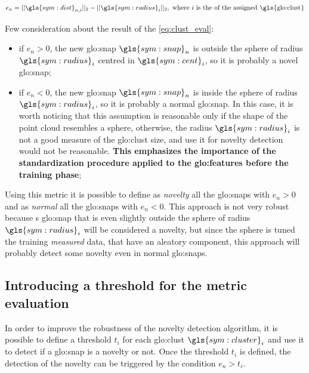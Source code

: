 \begin{equation}
  \label{eq:clust_eval}
  e_{n} = ||\gls{sym:dist}_{n,i}||_2 - ||\gls{sym:radius}_{i}||_2, \text{ where $i$ is the of the assigned \gls{glo:clust}}
\end{equation}

Few consideration about the result of the \autoref{eq:clust_eval}:
\begin{itemize}
  \item if $e_{n} > 0$, the new {\gls{glo:snap}} $\gls{sym:snap}_n$ is outside the sphere of radius $\gls{sym:radius}_i$ centred in $\gls{sym:cent}_i$, so it is probably a novel {\gls{glo:snap}};
  \item if $e_{n} < 0$, the new {\gls{glo:snap}} $\gls{sym:snap}_n$ is inside the sphere of radius $\gls{sym:radius}_i$, so it is probably a normal {\gls{glo:snap}}. In this case, it is worth noticing that this assumption is reasonable only if the shape of the point cloud resembles a sphere, otherwise, the radius $\gls{sym:radius}_i$ is not a good measure of the \gls{glo:clust} size, and use it for novelty detection would not be reasonable. \textbf{This emphasizes the importance of the standardization procedure applied to the \gls{glo:feature}s before the training phase};
\end{itemize}



Using this metric it is possible to define as \emph{novelty} all the {\gls{glo:snap}}s with $e_{n} > 0$ and as \emph{normal} all the {\gls{glo:snap}}s with $e_{n} < 0$. This approach is not very robust because s {\gls{glo:snap}} that is even slightly outside the sphere of radius $\gls{sym:radius}_i$ will be considered a novelty, but since the sphere is tuned the training \emph{measured} data, that have an aleatory component, this approach will probably detect some novelty even in normal {\gls{glo:snap}}s.

\subsection{Introducing a threshold for the metric evaluation}
\label{sec:clust_threshold}
In order to improve the robustness of the novelty detection algorithm, it is possible to define a threshold ${t}_i$ for each \gls{glo:clust} $\gls{sym:cluster}_i$ and use it to detect if a {\gls{glo:snap}} is a novelty or not. Once the threshold ${t}_i$ is defined, the detection of the novelty can be triggered by the condition $e_{n} > {t}_i$.

